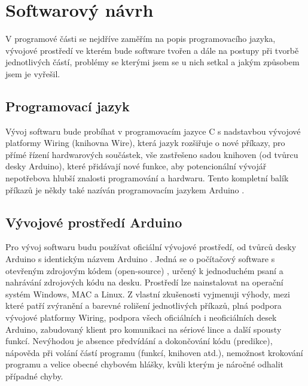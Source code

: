 \documentclass[FM,BP]{tulthesis}  %
\begin{document}

\chapter{Softwarový návrh}
V programové části se nejdříve zaměřím na popis programovacího jazyka, vývojové prostředí ve kterém bude software tvořen a dále na postupy při tvorbě jednotlivých částí, problémy se kterými jsem se u nich setkal a jakým způsobem jsem je vyřešil.

\section{Programovací jazyk}
Vývoj softwaru bude probíhat v programovacím jazyce C s nadstavbou vývojové platformy Wiring  (knihovna Wire)\cite{Arduino acce}, která jazyk rozšiřuje o nové příkazy, pro přímé řízení hardwarových součástek, vše zastřešeno sadou knihoven \cite{Arduino lib} (od tvůrcu desky Arduino), které přidávají nové funkce, aby potencionální vývojář nepotřebova hlubší znalosti programování a hardwaru. Tento kompletní balík příkazů \cite{Arduino lang} je někdy také nazíván programovacím jazykem Arduino \cite{Arduino intro}.

\section{Vývojové prostředí Arduino}
Pro vývoj softwaru budu používat oficiální vývojové prostředí, od tvůrců desky Arduino s identickým názvem Arduino \cite{Arduino soft}. Jedná se o počítačový software s otevřeným zdrojovým kódem (open-source) \cite{Arduino source}, určený k jednoduchém psaní a nahrávání zdrojových kódu na desku. Prostředí lze nainstalovat na operační systém Windows, MAC a Linux. Z vlastní zkušenosti vyjmenuji výhody, mezi které patří zvýranění a barevné rolišení jednotlivých příkazů, plná podpora vývojové platformy Wiring, podpora všech oficiálních i neoficiálních desek Arduino, zabudovaný klient pro komunikaci na sériové lince a další spousty funkcí. Nevýhodou je absence předvídání a dokončování kódu (predikce), nápověda při volání částí programu (funkcí, knihoven atd.), nemožnost krokování programu a velice obecné chybovém hlášky, kvůli kterým je náročné odhalit případné chyby.
\end{document}

